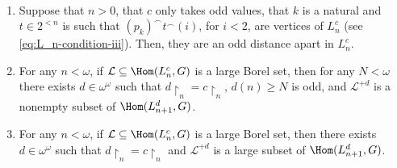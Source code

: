 \begin{lemma}\label{lemma:Ln_basics}~ 
    \begin{enumerate}[label=(\alph*)]
        \item Suppose that $n>0$, that $c$ only takes odd values, that $k$ is a natural and $t\in2^{<n}$ is such that $(p_k)^\smallfrown t^\smallfrown(i)$, for $i<2$, are vertices of $L^c_n$ (see \eqref{eq:L_n-condition-iii}).
        Then, they are an odd distance apart in $L^c_n$.

        \item For any $n<\omega$, if $\mathcal L\subseteq\Hom(L^c_n,G)$ is a large Borel set, then for any $N<\omega$ there exists $d\in\omega^\omega$ such that $d\restriction_n=c\restriction_n$, $d(n)\geq N$ is odd, and $\mathcal L^{+d}$ is a nonempty subset of $\Hom(L^{d}_{n+1},G)$.

        \item For any $n<\omega$, if $\mathcal L\subseteq\Hom(L^c_n,G)$ is a large Borel set, then there exists $d\in\omega^\omega$ such that $d\restriction_n=c\restriction_n$ and $\mathcal L^{+d}$ is a large subset of $\Hom(L^{d}_{n+1},G)$.
    \end{enumerate}
\end{lemma}

